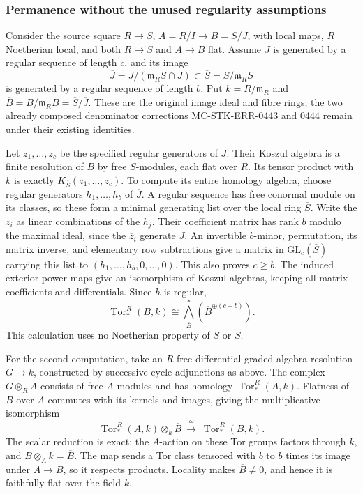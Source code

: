 \subsubsection{Permanence without the unused regularity assumptions}\label{algebra-proof-045-permanence-without-the-unused-regularity-assumptions}

Consider the source square \(R\to S\), \(A=R/I\to B=S/J\), with local maps, \(R\) Noetherian local, and both \(R\to S\) and \(A\to B\) flat. Assume \(J\) is generated by a regular sequence of length \(c\), and its image \[
\overline J=J/(\mathfrak m_RS\cap J)\subset\overline S=S/\mathfrak m_RS
\] is generated by a regular sequence of length \(b\). Put \(k=R/\mathfrak m_R\) and \(\overline B=B/\mathfrak m_RB=\overline S/\overline J\). These are the original image ideal and fibre rings; the two already composed denominator corrections MC-\AlgebraIdentifierBreak{}STK-\AlgebraIdentifierBreak{}ERR-\AlgebraIdentifierBreak{}0443 and 0444 remain under their existing identities.

Let \(z_1,\ldots,z_c\) be the specified regular generators of \(J\). Their Koszul algebra is a finite resolution of \(B\) by free \(S\)-modules, each flat over \(R\). Its tensor product with \(k\) is exactly \(K_{\overline S}(\overline z_1,\ldots,\overline z_c)\). To compute its entire homology algebra, choose regular generators \(h_1,\ldots,h_b\) of \(\overline J\). A regular sequence has free conormal module on its classes, so these form a minimal generating list over the local ring \(\overline S\). Write the \(\overline z_i\) as linear combinations of the \(h_j\). Their coefficient matrix has rank \(b\) modulo the maximal ideal, since the \(\overline z_i\) generate \(\overline J\). An invertible \(b\)-minor, permutation, its matrix inverse, and elementary row subtractions give a matrix in \(\mathrm{GL}_c(\overline S)\) carrying this list to \((h_1,\ldots,h_b,0,\ldots,0)\). This also proves \(c\geq b\). The induced exterior-power maps give an isomorphism of Koszul algebras, keeping all matrix coefficients and differentials. Since \(h\) is regular, \[
\operatorname{Tor}^R_*(B,k)
\cong\bigwedge^*_{\overline B}(\overline B^{\oplus(c-b)}).
\tag{6}
\] This calculation uses no Noetherian property of \(S\) or \(\overline S\).

For the second computation, take an \(R\)-free differential graded algebra resolution \(G\to k\), constructed by successive cycle adjunctions as above. The complex \(G\otimes_R A\) consists of free \(A\)-modules and has homology \(\operatorname{Tor}^R_*(A,k)\). Flatness of \(B\) over \(A\) commutes with its kernels and images, giving the multiplicative isomorphism \[
\operatorname{Tor}^R_*(A,k)\otimes_k\overline B
\ \xrightarrow{\ \cong\ }\ \operatorname{Tor}^R_*(B,k).
\tag{7}
\] The scalar reduction is exact: the \(A\)-action on these Tor groups factors through \(k\), and \(B\otimes_A k=\overline B\). The map sends a Tor class tensored with \(b\) to \(b\) times its image under \(A\to B\), so it respects products. Locality makes \(\overline B\ne0\), and hence it is faithfully flat over the field \(k\).

